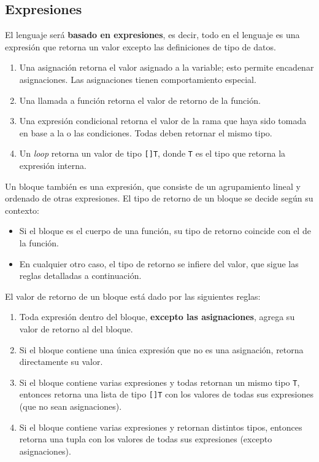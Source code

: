 \subsection{Expresiones}

El lenguaje será \textbf{basado en expresiones}, es decir, todo en el lenguaje
es una expresión que retorna un valor excepto las definiciones de tipo de datos.

\begin{enumerate}
	\item Una asignación retorna el valor asignado a la variable; esto permite
	  encadenar asignaciones. Las asignaciones tienen comportamiento especial.
	\item Una llamada a función retorna el valor de retorno de la función.
	\item Una expresión condicional retorna el valor de la rama que haya sido
	  tomada en base a la o las condiciones. Todas deben retornar el mismo tipo.
	\item Un \textit{loop} retorna un valor de tipo \texttt{[]T}, donde \texttt{T}
	  es el tipo que retorna la expresión interna.
\end{enumerate}

Un bloque también es una expresión, que consiste de un agrupamiento lineal y
ordenado de otras expresiones. El tipo de retorno de un bloque se decide según
su contexto:

\begin{itemize}
	\item Si el bloque es el cuerpo de una función, su tipo de retorno coincide con
	  el de la función.
	\item En cualquier otro caso, el tipo de retorno se infiere del valor, que
	  sigue las reglas detalladas a continuación.
\end{itemize}

El valor de retorno de un bloque está dado por las siguientes reglas:

\begin{enumerate}
	\item Toda expresión dentro del bloque, \textbf{excepto las asignaciones},
	  agrega su valor de retorno al del bloque.
	\item Si el bloque contiene una única expresión que no es una asignación,
	  retorna directamente su valor.
	\item Si el bloque contiene varias expresiones y todas retornan un mismo tipo
	  \texttt{T}, entonces retorna una lista de tipo \texttt{[]T} con los valores
		de todas sus expresiones (que no sean asignaciones).
	\item Si el bloque contiene varias expresiones y retornan distintos tipos,
	  entonces retorna una tupla con los valores de todas sus expresiones (excepto
		asignaciones).
\end{enumerate}

